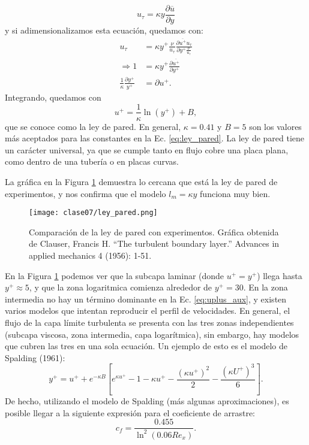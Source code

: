 %
\begin{equation}
u_\tau = \kappa y \frac{\partial\overline{u}}{\partial y}
\end{equation}
%
y si adimensionalizamos esta ecuación, quedamos con:
%
\begin{align}
u_\tau &= \kappa y^+\frac{\nu}{u_\tau} \frac{\partial\overline{u^+}u_\tau}{\partial y^+ \frac{\nu}{u_\tau}}\nonumber\\
\Rightarrow 1&= \kappa y^+ \frac{\partial\overline{u^+}}{\partial y^+}\nonumber\\
\frac{1}{\kappa}\frac{\partial y^+}{y^+} &= \partial u^+.
\end{align}
%
Integrando, quedamos con
%
\begin{equation}\label{eq:ley_pared}
u^+ = \frac{1}{\kappa}\ln(y^+) + B,
\end{equation}
%
que se conoce como la ley de pared.
En general, $\kappa=0.41$ y $B=5$ son los valores más aceptados para las constantes en la Ec. \eqref{eq:ley_pared}.
La ley de pared tiene un carácter universal, ya que se cumple tanto en flujo cobre una placa plana, como dentro de una tubería o en placas curvas.

La gráfica en la Figura \ref{fig:ley_pared} demuestra lo cercana que está la ley de pared de experimentos, y nos confirma que el modelo $l_m = \kappa y$ funciona muy bien.
%
\begin{figure}
\centering
\texttt{[image: clase07/ley\_pared.png]}
\caption{Comparación de la ley de pared con experimentos. Gráfica obtenida de Clauser, Francis H. ``The turbulent boundary layer.'' Advances in applied mechanics 4 (1956): 1-51.}
\label{fig:ley_pared}
\end{figure}

En la Figura \ref{fig:ley_pared} podemos ver que la subcapa laminar (donde $u^+=y^+$) llega hasta $y^+\approx5$, y que la zona logaritmica comienza alrededor de $y^+=30$.
En la zona intermedia no hay un término dominante en la Ec. \eqref{eq:uplus_aux}, y existen varios modelos que intentan reproducir el perfil de velocidades.
En general, el flujo de la capa límite turbulenta se presenta con las tres zonas independientes (subcapa viscosa, zona intermedia, capa logarítmica), sin embargo, hay modelos que cubren las tres en una sola ecuación.
Un ejemplo de esto es el modelo de Spalding (1961):
%
\begin{equation}\label{eq:spalding}
y^+ = u^+ + e^{-\kappa B}\left[e^{\kappa u^+} -1 -\kappa u^+ -\frac{(\kappa u^+)^2}{2} - \frac{(\kappa U^+)^3}{6}\right].
\end{equation}
%
De hecho, utilizando el modelo de Spalding (más algunas aproximaciones), es posible llegar a la siguiente expresión para el coeficiente de arrastre:
%
\begin{equation}\label{eq:cf}
c_f = \frac{0.455}{\ln^2(0.06 Re_x)}.
\end{equation}

